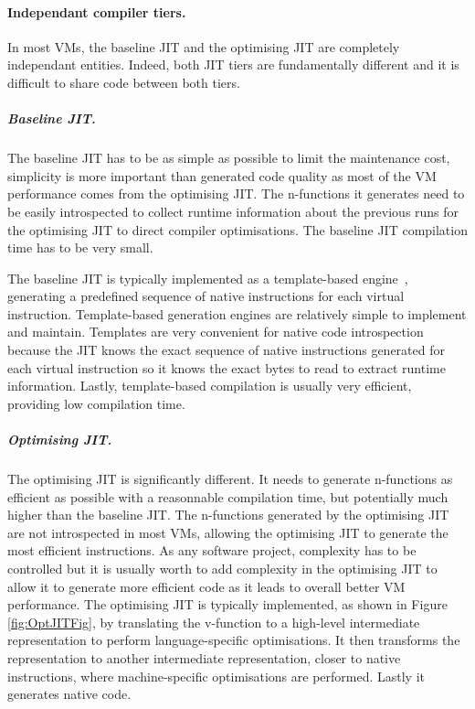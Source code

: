 \documentclass[a4paper,12pt,twoside]{../includes/ThesisStyle}
\begin{document}
\paragraph{Independant compiler tiers.}
In most VMs, the baseline JIT and the optimising JIT are completely independant entities. Indeed, both JIT tiers are fundamentally different and it is difficult to share code between both tiers. 

\subparagraph{Baseline JIT.} The baseline JIT has to be as simple as possible to limit the maintenance cost, simplicity is more important than generated code quality as most of the VM performance comes from the optimising JIT. The n-functions it generates need to be easily introspected to collect runtime information about the previous runs for the optimising JIT to direct compiler optimisations. The baseline JIT compilation time has to be very small.

The baseline JIT is typically implemented as a template-based engine~\cite{Deut84a}, generating a predefined sequence of native instructions for each virtual instruction. Template-based generation engines are relatively simple to implement and maintain. Templates are very convenient for native code introspection because the JIT knows the exact sequence of native instructions generated for each virtual instruction so it knows the exact bytes to read to extract runtime information. Lastly, template-based compilation is usually very efficient, providing low compilation time.

\subparagraph{Optimising JIT.} The optimising JIT is significantly different. It needs to generate n-functions as efficient as possible with a reasonnable compilation time, but potentially much higher than the baseline JIT. The n-functions generated by the optimising JIT are not introspected in most VMs, allowing the optimising JIT to generate the most efficient instructions. As any software project, complexity has to be controlled but it is usually worth to add complexity in the optimising JIT to allow it to generate more efficient code as it leads to overall better VM performance. The optimising JIT is typically implemented, as shown in Figure \ref{fig:OptJITFig}, by translating the v-function to a high-level intermediate representation to perform language-specific optimisations. It then transforms the representation to another intermediate representation, closer to native instructions, where machine-specific optimisations are performed. Lastly it generates native code.
\end{document}
